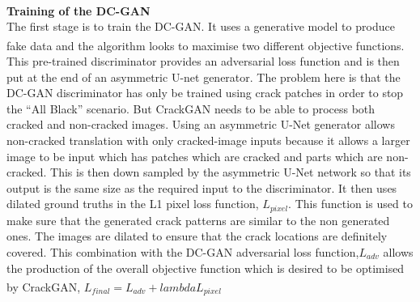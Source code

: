 \documentclass[11pt]{article}		%
\newcommand{\supercite}[1]{\textsuperscript{\cite{#1}}}		%
\begin{document}
	        \\
    		\textbf{Training of the DC-GAN}
    		\\
   		    The first stage is to train the DC-GAN. It uses a generative model to produce fake data and the algorithm looks to maximise two different objective functions.\supercite{CrackGAN1} This pre-trained discriminator provides an adversarial loss function and is then put at the end of an asymmetric U-net generator. The problem here is that the DC-GAN discriminator has only be trained using crack patches in order to stop the “All Black” scenario. But CrackGAN needs to be able to process both cracked and non-cracked images. Using an asymmetric U-Net generator allows non-cracked translation with only cracked-image inputs because it allows a larger image to be input which has patches which are cracked and parts which are non-cracked. This is then down sampled by the asymmetric U-Net network so that its output is the same size as the required input to the discriminator. It then uses dilated ground truths in the L1 pixel loss function, $L_{pixel}$. This function is used to make sure that the generated crack patterns are similar to the non generated ones. The images are dilated to ensure that the crack locations are definitely covered. This combination with the DC-GAN adversarial loss function,$L_{adv}$  allows the production of the overall objective function which is desired to be optimised by CrackGAN,
		    $L_{final}=L_{adv}+lambda L_{pixel}$
		    \supercite{CrackGAN}
			\supercite{CrackGAN1}
		
\end{document}
